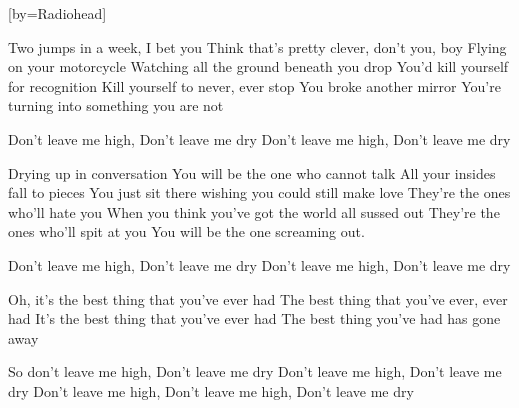 

[by=Radiohead]

\begin{LARGE}
\chordsoff


\beginverse
Two jumps in a week, I bet you
Think that's pretty clever, don't you, boy
Flying on your motorcycle
Watching all the ground beneath you drop
You'd kill yourself for recognition
Kill yourself to never, ever stop
You broke another mirror
You're turning into something you are not
\endverse

\beginchorus
Don't leave me high, Don't leave me dry
Don't leave me high, Don't leave me dry
\endchorus

\beginverse
Drying up in conversation
You will be the one who cannot talk
All your insides fall to pieces
You just sit there wishing you could still make love
They're the ones who'll hate you
When you think you've got the world all sussed out
They're the ones who'll spit at you
You will be the one screaming out.
\endverse

\beginchorus
Don't leave me high, Don't leave me dry
Don't leave me high, Don't leave me dry
\endchorus

\beginverse
Oh, it's the best thing that you've ever had
The best thing that you've ever, ever had
It's the best thing that you've ever had
The best thing you've had has gone away
\endverse

\beginchorus
So don't leave me high, Don't leave me dry
Don't leave me high, Don't leave me dry
Don't leave me high, Don't leave me high, Don't leave me dry
\endchorus

\end{LARGE}


\chordson
\endsong
